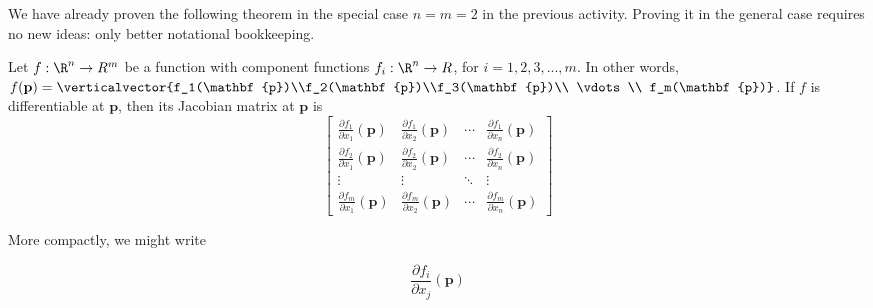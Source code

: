 \documentclass{ximera}
\begin{document}
	We have already proven the following theorem in the special case $n=m=2$ in the previous activity.  Proving it in the general case requires no new ideas: 
	 only better notational bookkeeping.
	
	\begin{theorem}
		Let $f:\R^n \to R^m$ be a function with component functions $f_i:\R^n \to R$, for $i=1,2,3,...,m$.  In other words,
		$f(\mathbf{p}) = \verticalvector{f_1(\mathbf{p})\\f_2(\mathbf{p})\\f_3(\mathbf{p})\\ \vdots \\ f_m(\mathbf{p})}$.  If $f$ is differentiable at $\mathbf{p}$,
		 then its Jacobian matrix at $\mathbf{p}$ is 
                 \[
                 \begin{bmatrix}
                   \frac{\partial f_1}{\partial x_1} \left(\mathbf{p}\right) & \frac{\partial f_1}{\partial x_2} \left(\mathbf{p}\right) & \cdots & \frac{\partial f_1}{\partial x_n}\left(\mathbf{p}\right) \\
                   \frac{\partial f_2}{\partial x_1} \left(\mathbf{p}\right) & \frac{\partial f_2}{\partial x_2} \left(\mathbf{p}\right) & \cdots & \frac{\partial f_2}{\partial x_n}\left(\mathbf{p}\right) \\
                   \vdots                                                    & \vdots                                                    & \ddots & \vdots \\
                   \frac{\partial f_m}{\partial x_1} \left(\mathbf{p}\right) & \frac{\partial f_m}{\partial x_2} \left(\mathbf{p}\right) & \cdots & \frac{\partial f_m}{\partial x_n}\left(\mathbf{p}\right) 
                 \end{bmatrix}
                 \]
		  
		  More compactly, we might write
		  
		  \[
		  	\frac{\partial f_i}{\partial x_j} \left( \mathbf{p} \right)
		  \]
		  

	\end{theorem}
	
\end{document}
